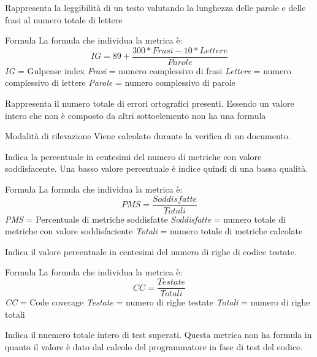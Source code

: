Rappresenta la leggibilità di un testo valutando la lunghezza delle parole e delle frasi al numero totale di lettere
\par{Formula}
La formula che individua la metrica è:
\begin{displaymath}
\textit{IG} = 89 + \frac{300 * \textit{Frasi} - 10* \textit{Lettere}}{\textit{Parole}}
\end{displaymath}
\textit{IG} = Gulpease index
\textit{Frasi} = numero complessivo di frasi
\textit{Lettere} = numero complessivo di lettere
\textit{Parole} = numero complessivo di parole


Rappresenta il numero totale di errori ortografici presenti. Essendo un valore intero che non è composto da altri sottoelemento non ha una formula
\par{Modalità di rilevazione}
Viene calcolato durante la verifica di un documento.


Indica la percentuale in centesimi del numero di metriche con valore soddisfacente. Una basso valore percentuale è indice quindi di una bassa qualità.
\par{Formula}
La formula che individua la metrica è:
\begin{displaymath}
  \textit{PMS} = \frac{\textit{Soddisfatte}}{\textit{Totali}}
\end{displaymath}
  \textit{PMS} = Percentuale di metriche soddisfatte
  \textit{Soddisfatte} = numero totale di metriche con valore soddisfaciente
  \textit{Totali} = numero totale di metriche calcolate



Indica il valore percentuale in centesimi del numero di righe di codice testate.
\par{Formula}
La formula che individua la metrica è:
\begin{displaymath}
  \textit{CC} = \frac{\textit{Testate}}{\textit{Totali}}
\end{displaymath}
 \textit{CC} = Code coverage
 \textit{Testate} = numero di righe testate
 \textit{Totali} = numero di righe totali


Indica il nuemero totale intero di test superati. Questa metrica non ha formula in quanto il valore è dato dal calcolo del programmatore in fase di test del codice.
